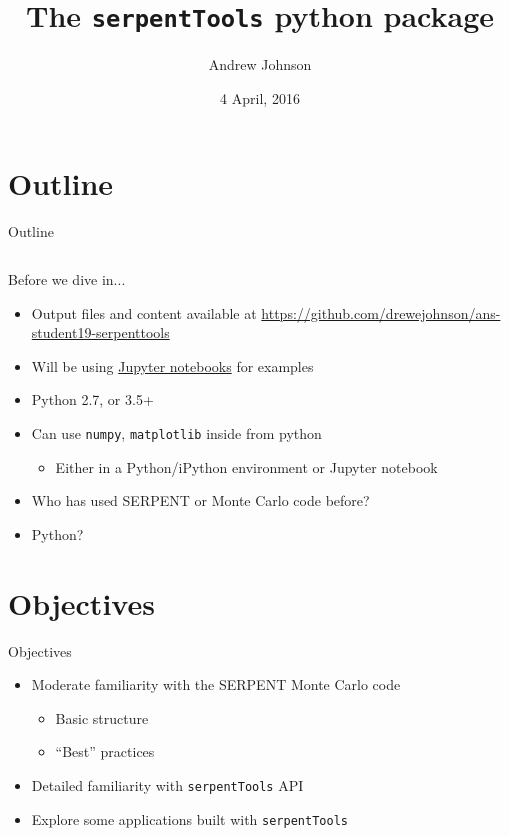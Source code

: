 \documentclass{beamer}
\title{The \texttt{serpentTools} python package}
\author{Andrew Johnson}
\date[2019 ANS Student Conference]{4 April, 2016}
\newcommand{\st}{\texttt{serpentTools} }
\begin{document}
\begin{frame}
\titlepage
\end{frame}

\section*{Outline}
\begin{frame}{Outline}
    \begin{columns}[t]
        \tableofcontents[hideallsubsections,sections={1-5}]
        \tableofcontents[hideallsubsections,sections={6-9}]
    \end{columns}
\end{frame}

\begin{frame}{Before we dive in...}
    \begin{itemize}
        \item{Output files and content available at \url{https://github.com/drewejohnson/ans-student19-serpenttools}}
        \item Will be using \href{https://jupyter.org/}{Jupyter notebooks} for examples
        \item Python 2.7, or 3.5+
        \item Can use \texttt{numpy}, \texttt{matplotlib} inside from python
            \begin{itemize}
                \item Either in a Python/iPython environment or Jupyter notebook
            \end{itemize}
        \item{Who has used SERPENT or Monte Carlo code before?}
        \item{Python?}
    \end{itemize}
\end{frame}

\section{Objectives}

\begin{frame}{Objectives}
    \begin{itemize}
        \item Moderate familiarity with the SERPENT Monte Carlo code
        \begin{itemize}
            \item Basic structure
            \item ``Best'' practices
        \end{itemize}
        \item Detailed familiarity with \st API
        \item Explore some applications built with \st
    \end{itemize}
\end{frame}
\end{document}

